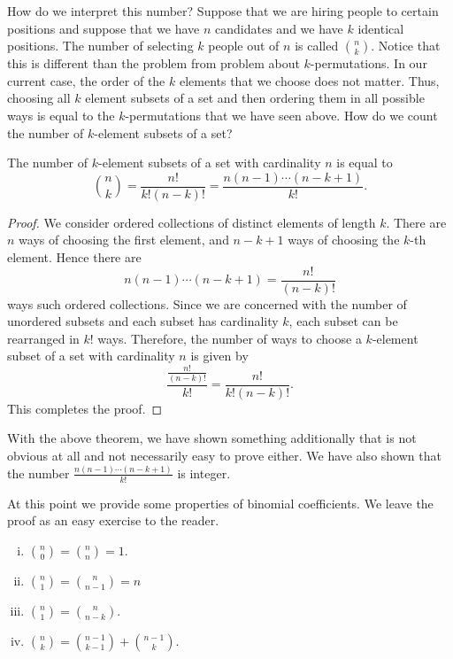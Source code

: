 How do we interpret this number? Suppose that we are hiring people to certain positions and suppose that we have $n$ candidates and we have $k$ identical positions.
The number of selecting $k$ people out of $n$ is called ${n \choose k}$. Notice that this is different than the problem from problem about $k$-permutations.
In our current case, the order of the $k$ elements that we choose does not matter. Thus, choosing all $k$ element subsets of a set and then ordering them in all possible ways
is equal to the $k$-permutations that we have seen above. How do we count the number of $k$-element subsets of a set?

\begin{theorem}
The number of $k$-element subsets of a set with cardinality $n$ is equal to 
$$
{n \choose k}=\frac{n!}{k!(n-k)!}=\frac{n(n-1)\cdots (n-k+1)}{k!}.
$$
\label{thmBinomial}
\end{theorem}

\begin{proof}
We consider ordered collections of distinct elements of length $k$. There are $n$ ways of choosing the first element, and $n-k+1$ ways of choosing the $k$-th element.
Hence there are 
$$
n(n-1)\cdots (n-k+1)=\frac{n!}{(n-k)!}
$$
ways such ordered collections. Since we are concerned with the number of unordered subsets and each subset has cardinality $k$, each subset can be rearranged in $k!$ ways.
Therefore, the number of ways to choose a $k$-element subset of a set with cardinality $n$ is given by 
$$
\frac{\frac{n!}{(n-k)!}}{k!}=\frac{n!}{k!(n-k)!}.
$$
This completes the proof.
\end{proof}

With the above theorem, we have shown something additionally that is not obvious at all and not necessarily easy to prove either.
We have also shown that the number $\frac{n(n-1)\cdots (n-k+1)}{k!}$ is integer.

At this point we provide some properties of binomial coefficients. We leave the proof as an easy exercise to the reader.

\begin{enumerate}[(i)]
    \item $\displaystyle {n \choose 0}={n \choose n}=1$.
    \item $\displaystyle {n \choose 1}={n \choose n-1}=n$
    \item $\displaystyle {n \choose 1}={n \choose n-k}$.
    \item $\displaystyle {n \choose k}={n - 1 \choose k -1} + {n - 1 \choose k}$.
\end{enumerate}


